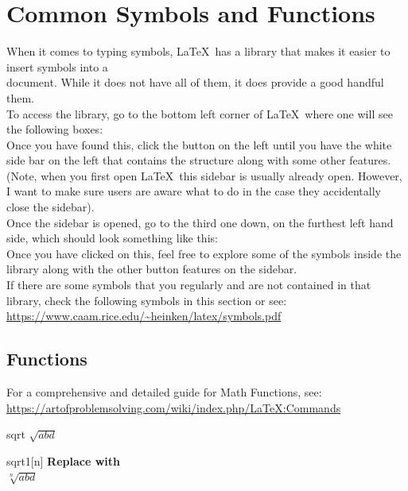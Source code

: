 \documentclass[12pt,hidelinks]{article}
\begin{document}
\section{Common Symbols and Functions}
\vspace{10.5cm}
When it comes to typing symbols, \LaTeX\ has a library that makes it easier to insert symbols into a\\ document. While it does not have all of them, it does provide a good handful them.\\
To access the library, go to the bottom left corner of \LaTeX\ where one will see the following boxes:\\	
Once you have found this, click the button on the left until you have the white side bar on the left that contains the structure along with some other features. (Note, when you first open \LaTeX\ this sidebar is usually already open. However, I want to make sure users are aware what to do in the case they accidentally close the sidebar).\\
Once the sidebar is opened, go to the third one down, on the furthest left hand side, which should look something like this:\\
Once you have clicked on this, feel free to explore some of the symbols inside the library along with the other button features on the sidebar.\\ 
If there are some symbols that you regularly and are not contained in that library, check the following symbols in this section or see: \url{https://www.caam.rice.edu/~heinken/latex/symbols.pdf}
	\subsection{Functions}
	For a comprehensive and detailed guide for Math Functions, see:\\ \url{https://artofproblemsolving.com/wiki/index.php/LaTeX:Commands}
		\begin{docCommand}{sqrt}{}
			$\sqrt{abd}$
		\end{docCommand}
		\begin{docCommand}{sqrt1}{[n]}
		    \textbf{Replace  with }\\
			$\sqrt[n]{abd}$
		\end{docCommand}
\end{document}

